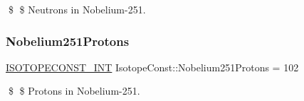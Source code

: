 \$ \$ Neutrons in Nobelium-\/251. \mbox{\label{group___isotope_const-_nobelium-_no251_gad11ad1ee61ad9a882c1e5a1ad13ba076}} 
\subsubsection{\texorpdfstring{Nobelium251\+Protons}{Nobelium251Protons}}
{\footnotesize\ttfamily \mbox{\hyperlink{group___isotope_const-_macros_ga5f18360b3e99483a35c32d789e62621c}{I\+S\+O\+T\+O\+P\+E\+C\+O\+N\+S\+T\+\_\+\+I\+NT}} Isotope\+Const\+::\+Nobelium251\+Protons = 102}

\$ \$ Protons in Nobelium-\/251. 